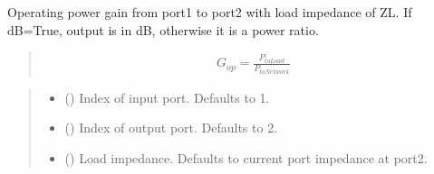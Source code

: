 \documentclass[letterpaper,10pt,english]{sphinxmanual}
\begin{document}
\begin{fulllineitems}
\begin{fulllineitems}
\begin{quote}
\begin{description}
\end{description}\end{quote}

\end{fulllineitems}


\begin{fulllineitems}
\label{\detokenize{touchstone:touchstone.spfile.gop}}
\pysigstartsignatures
{}
\pysigstopsignatures
\sphinxAtStartPar
Operating power gain from port1 to port2 with load impedance of ZL. If dB=True, output is in dB, otherwise it is a power ratio.
\begin{quote}
\begin{equation*}
\begin{split}G_{op}=\frac{P_{toLoad}}{P_{toNetwork}}\end{split}
\end{equation*}\end{quote}
\begin{quote}\begin{description}
\begin{itemize}
\item {}
\sphinxAtStartPar
{} (\sphinxstyleliteralemphasis{\sphinxupquote{, }}) \textendash{} Index of input port. Defaults to 1.

\item {}
\sphinxAtStartPar
{} (\sphinxstyleliteralemphasis{\sphinxupquote{, }}) \textendash{} Index of output port. Defaults to 2.

\item {}
\sphinxAtStartPar
{} (\sphinxstyleliteralemphasis{\sphinxupquote{, }}) \textendash{} Load impedance. Defaults to current port impedance at port2.


\end{itemize}
\end{description}
\end{quote}
\end{fulllineitems}
\end{fulllineitems}
\end{document}
